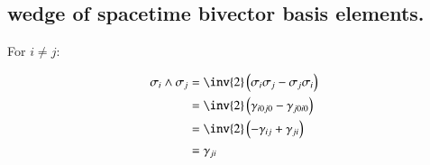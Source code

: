\subsection{wedge of spacetime bivector basis elements. }

For $i \ne j$:

\begin{align*}
\sigma_i \wedge \sigma_j
&= \inv{2}\left( \sigma_i \sigma_j - \sigma_j \sigma_i \right) \\
&= \inv{2}\left( \gamma_{i0j0} - \gamma_{j0i0} \right) \\
&= \inv{2}\left( -\gamma_{ij} +\gamma_{ji} \right) \\
&= \gamma_{ji}
\end{align*}
